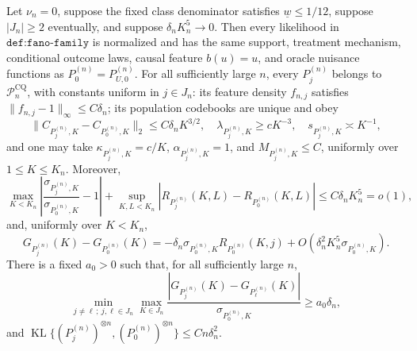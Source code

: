 Let \(\nu_n=0\), suppose the fixed class denominator satisfies \(\underline w\leq1/12\), suppose \(|J_n|\geq2\) eventually, and suppose \(\delta_nK_n^5\to0\).  Then every likelihood in \(\texttt{def:fano-family}\) is normalized and has the same support, treatment mechanism, conditional outcome laws, causal feature \(b(u)=u\), and oracle nuisance functions as \(P_0^{(n)}=P_{U,0}^{(n)}\).  For all sufficiently large \(n\), every \(P_j^{(n)}\) belongs to \(\mathcal P_n^{\mathrm{CQ}}\), with constants uniform in \(j\in J_n\): its feature density \(f_{n,j}\) satisfies \(\|f_{n,j}-1\|_\infty\leq C\delta_n\); its population codebooks are unique and obey
\[
 \|C_{P_j^{(n)},K}-C_{P_0^{(n)},K}\|_2\leq C\delta_nK^{3/2},\quad
 \lambda_{P_j^{(n)},K}\geq cK^{-3},\quad
 s_{P_j^{(n)},K}\asymp K^{-1},
\]
and one may take \(\kappa_{P_j^{(n)},K}=c/K\), \(\alpha_{P_j^{(n)},K}=1\), and \(M_{P_j^{(n)},K}\leq C\), uniformly over \(1\leq K\leq K_n\).  Moreover,
\[
 \max_{K<K_n}\left|\frac{\sigma_{P_j^{(n)},K}}{\sigma_{P_0^{(n)},K}}-1\right|
 +\sup_{K,L<K_n}|R_{P_j^{(n)}}(K,L)-R_{P_0^{(n)}}(K,L)|
 \leq C\delta_nK_n^5=o(1),
\]
and, uniformly over \(K<K_n\),
\[
 G_{P_j^{(n)}}(K)-G_{P_0^{(n)}}(K)
 =-\delta_n\sigma_{P_0^{(n)},K}R_{P_0^{(n)}}(K,j)
 +O\!\left(\delta_n^2K_n^5\sigma_{P_0^{(n)},K}\right).
\]
There is a fixed \(a_0>0\) such that, for all sufficiently large \(n\),
\[
 \min_{j\ne\ell\,;\ j,\ell\in J_n}\max_{K\in J_n}
 \frac{|G_{P_j^{(n)}}(K)-G_{P_\ell^{(n)}}(K)|}{\sigma_{P_0^{(n)},K}}
 \geq a_0\delta_n,
\]
and \(\operatorname{KL}\{(P_j^{(n)})^{\otimes n},(P_0^{(n)})^{\otimes n}\}\leq Cn\delta_n^2\).